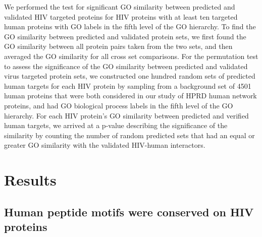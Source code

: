 We performed the test for significant GO similarity between predicted
and validated HIV targeted proteins for HIV proteins with at least ten
targeted human proteins with GO labels in the fifth level of the GO
hierarchy. To find the GO similarity between predicted and validated
protein sets, we first found the GO similarity between all protein
pairs taken from the two sets, and then averaged the GO similarity for
all cross set comparisons. For the permutation test to assess the
significance of the GO similarity between predicted and validated
virus targeted protein sets, we constructed one hundred random sets of
predicted human targets for each HIV protein by sampling from a
background set of 4501 human proteins that were both considered in our
study of HPRD human network proteins, and had GO biological process
labels in the fifth level of the GO hierarchy. For each HIV protein's
GO similarity between predicted and verified human targets, we arrived
at a p-value describing the significance of the similarity by counting
the number of random predicted sets that had an equal or greater GO
similarity with the validated HIV-human interactors.


\section{Results}

\subsection{Human peptide motifs were conserved on HIV proteins}


